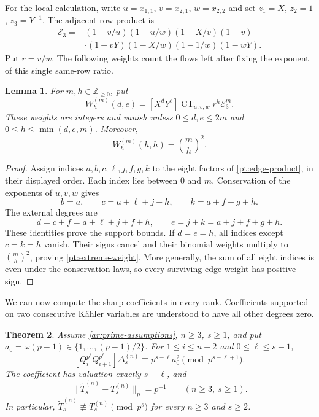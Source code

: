 \documentclass[11pt]{amsart}
\newtheorem{theorem}{Theorem}[section]
\newtheorem{lemma}[theorem]{Lemma}
\theoremstyle{definition}
\theoremstyle{remark}
\numberwithin{equation}{section}
\newcommand{\Z}{\mathbb Z}
\DeclareMathOperator{\CT}{CT}
\begin{document}
For the local calculation, write $u=x_{1,1}$, $v=x_{2,1}$,
$w=x_{2,2}$ and set $z_1=X$, $z_2=1$, $z_3=Y^{-1}$.
The adjacent-row product is
\begin{equation}\label{pt:edge-product}
\begin{split}
 \mathscr E_3={}&(1-v/u)(1-u/w)(1-X/v)(1-v)\\
 &\cdot(1-vY)(1-X/w)(1-1/w)(1-wY).
\end{split}
\end{equation}
Put $r=v/w$. The following weights count the flows left after
fixing the exponent of this single same-row ratio.

\begin{lemma}\label{pt:flow-weights}
For $m,h\in\Z_{\geq0}$, put
\[
 W_h^{(m)}(d,e)=[X^dY^e]\CT_{u,v,w}r^h\mathscr E_3^m.
\]
These weights are integers and vanish unless
$0\leq d,e\leq2m$ and $0\leq h\leq\min(d,e,m)$. Moreover,
\begin{equation}\label{pt:extreme-weight}
 W_h^{(m)}(h,h)=\binom mh^2.
\end{equation}
\end{lemma}

\begin{proof}
Assign indices $a,b,c,\ell,j,f,g,k$ to the eight factors of
\eqref{pt:edge-product}, in their displayed order. Each index
lies between $0$ and $m$. Conservation of the exponents of
$u,v,w$ gives
\[
 b=a,\qquad c=a+\ell+j+h,\qquad k=a+f+g+h.
\]
The external degrees are
\[
 d=c+f=a+\ell+j+f+h,\qquad
 e=j+k=a+j+f+g+h.
\]
These identities prove the support bounds. If $d=e=h$, all
indices except $c=k=h$ vanish. Their signs cancel and their
binomial weights multiply to $\binom mh^2$, proving
\eqref{pt:extreme-weight}. More generally, the sum of all eight
indices is even under the conservation laws, so every surviving
edge weight has positive sign.
\end{proof}

We can now compute the sharp coefficients in every rank.
Coefficients supported on two consecutive K\"ahler variables
are understood to have all other degrees zero.

\begin{theorem}\label{pt:sharpness}
Assume \eqref{ar:prime-assumptions}, $n\geq3$, $s\geq1$, and put
$a_0=\omega(p-1)\in\{1,\ldots,(p-1)/2\}$.
For $1\leq i\leq n-2$ and $0\leq\ell\leq s-1$,
\begin{equation}\label{pt:sharp-coefficient}
 [Q_i^{p^\ell}Q_{i+1}^{p^\ell}]\Delta_s^{(n)}
 \equiv p^{s-\ell}a_0^2\pmod{p^{s-\ell+1}}.
\end{equation}
The coefficient has valuation exactly $s-\ell$, and
\begin{equation}\label{pt:coefficient-norm}
 \|\widetilde T_s^{(n)}-T_s^{(n)}\|_p=p^{-1}
 \qquad(n\geq3,\ s\geq1).
\end{equation}
In particular,
$\widetilde T_s^{(n)}\not\equiv T_s^{(n)}\pmod{p^s}$ for every
$n\geq3$ and $s\geq2$.
\end{theorem}
\end{document}
